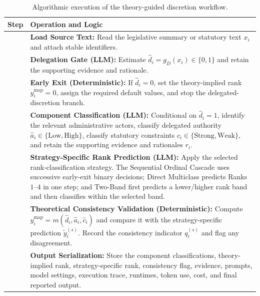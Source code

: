 \documentclass[runningheads]{llncs}
\begin{document}
\begin{table}[t]
\caption{Algorithmic execution of the theory-guided discretion workflow.}
\label{tab:algorithm}
\centering
\footnotesize
\begin{tabular}{@{}>{\raggedright\arraybackslash}p{}>{\raggedright\arraybackslash}p{}@{}}
\hline
\textbf{Step} & \textbf{Operation and Logic} \\
\hline

1 &
\textbf{Load Source Text:}
Read the legislative summary or statutory text \(x_i\) and attach
stable identifiers. \\

2 &
\textbf{Delegation Gate (LLM):}
Estimate
\(\hat d_i=g_D(x_i)\in\{0,1\}\)
and retain the supporting evidence and rationale. \\

3 &
\textbf{Early Exit (Deterministic):}
If \(\hat d_i=0\), set the theory-implied rank
\(y_i^{\mathrm{map}}=0\), assign the required default values, and stop
the delegated-discretion branch. \\

4 &
\textbf{Component Classification (LLM):}
Conditional on \(\hat d_i=1\), identify the relevant administrative
actors, classify delegated authority
\(\hat a_i\in\{\mathrm{Low},\mathrm{High}\}\), classify statutory
constraints
\(\hat c_i\in\{\mathrm{Strong},\mathrm{Weak}\}\), and retain the
supporting evidence and rationales \(r_i\). \\

5 &
\textbf{Strategy-Specific Rank Prediction (LLM):}
Apply the selected rank-classification strategy. The Sequential
Ordinal Cascade uses
successive early-exit binary decisions; Direct Multiclass predicts
Ranks \(1\)--\(4\) in one step; and Two-Band first predicts a
lower/higher rank band and then classifies within the selected band. \\

6 &
\textbf{Theoretical Consistency Validation (Deterministic):}
Compute
\(y_i^{\mathrm{map}}=m(\hat d_i,\hat a_i,\hat c_i)\)
and compare it with the strategy-specific prediction
\(\tilde y_i^{(s)}\). Record the consistency indicator
\(q_i^{(s)}\) and flag any disagreement. \\

7 &
\textbf{Output Serialization:}
Store the component classifications, theory-implied rank,
strategy-specific rank, consistency flag, evidence, prompts, model
settings, execution trace, runtimes, token use, cost, and final
reported output. \\

\hline
\end{tabular}
\end{table}
\end{document}
